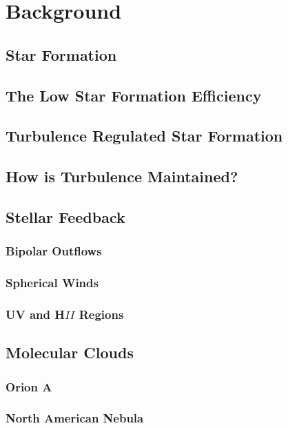 \section{Background}

\subsection{Star Formation}

\subsection{The Low Star Formation Efficiency}

\subsection{Turbulence Regulated Star Formation}

\subsection{How is Turbulence Maintained?}

\subsection{Stellar Feedback}

\subsubsection{Bipolar Outflows}

\subsubsection{Spherical Winds}

\subsubsection{UV and H$II$ Regions}

\subsection{Molecular Clouds}

\subsubsection{Orion A}

\subsubsection{North American Nebula}